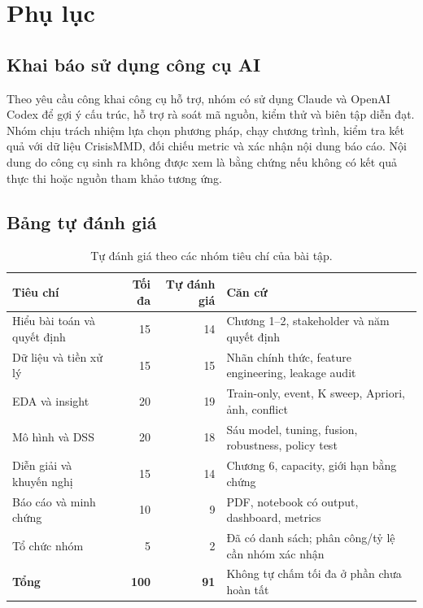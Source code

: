\appendix
\chapter{Phụ lục}

\section{Khai báo sử dụng công cụ AI}

Theo yêu cầu công khai công cụ hỗ trợ, nhóm có sử dụng Claude và OpenAI Codex
để gợi ý cấu trúc, hỗ trợ rà soát mã nguồn, kiểm thử và biên tập diễn đạt.
Nhóm chịu trách nhiệm lựa chọn phương pháp, chạy chương trình, kiểm tra kết quả
với dữ liệu CrisisMMD, đối chiếu metric và xác nhận nội dung báo cáo. Nội dung
do công cụ sinh ra không được xem là bằng chứng nếu không có kết quả thực thi
hoặc nguồn tham khảo tương ứng.

\section{Bảng tự đánh giá}

\begin{table}[H]\centering\small
\caption{Tự đánh giá theo các nhóm tiêu chí của bài tập.}
\begin{tabularx}{\textwidth}{XrrX}
\toprule
\textbf{Tiêu chí} & \textbf{Tối đa} & \textbf{Tự đánh giá} & \textbf{Căn cứ}\\
\midrule
Hiểu bài toán và quyết định & 15 & 14 & Chương 1--2, stakeholder và năm quyết định\\
Dữ liệu và tiền xử lý & 15 & 15 & Nhãn chính thức, feature engineering, leakage audit\\
EDA và insight & 20 & 19 & Train-only, event, K sweep, Apriori, ảnh, conflict\\
Mô hình và DSS & 20 & 18 & Sáu model, tuning, fusion, robustness, policy test\\
Diễn giải và khuyến nghị & 15 & 14 & Chương 6, capacity, giới hạn bằng chứng\\
Báo cáo và minh chứng & 10 & 9 & PDF, notebook có output, dashboard, metrics\\
Tổ chức nhóm & 5 & 2 & Đã có danh sách; phân công/tỷ lệ cần nhóm xác nhận\\
\midrule
\textbf{Tổng} & \textbf{100} & \textbf{91} & Không tự chấm tối đa ở phần chưa hoàn tất\\
\bottomrule
\end{tabularx}
\end{table}

